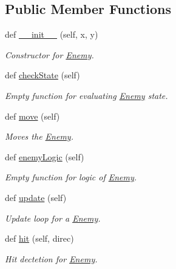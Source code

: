 \subsection*{Public Member Functions}
\begin{DoxyCompactItemize}
\item 
def \hyperlink{classactor_1_1enemy_1_1_enemy_a6924d71617a5022d67fd46b36141dfd2}{\+\_\+\+\_\+init\+\_\+\+\_\+} (self, x, y)
\begin{DoxyCompactList}\small\item\em Constructor for \hyperlink{classactor_1_1enemy_1_1_enemy}{Enemy}. \end{DoxyCompactList}\item 
\mbox{\label{classactor_1_1enemy_1_1_enemy_afa749d4d6a88fac474c3929ccd3b0753}} 
def \hyperlink{classactor_1_1enemy_1_1_enemy_afa749d4d6a88fac474c3929ccd3b0753}{check\+State} (self)
\begin{DoxyCompactList}\small\item\em Empty function for evaluating \hyperlink{classactor_1_1enemy_1_1_enemy}{Enemy} state. \end{DoxyCompactList}\item 
def \hyperlink{classactor_1_1enemy_1_1_enemy_acae64f8e1e7e13ee7c440c74e3c214c8}{move} (self)
\begin{DoxyCompactList}\small\item\em Moves the \hyperlink{classactor_1_1enemy_1_1_enemy}{Enemy}. \end{DoxyCompactList}\item 
\mbox{\label{classactor_1_1enemy_1_1_enemy_a94d38c945f048b873e33a539fb7cf502}} 
def \hyperlink{classactor_1_1enemy_1_1_enemy_a94d38c945f048b873e33a539fb7cf502}{enemy\+Logic} (self)
\begin{DoxyCompactList}\small\item\em Empty function for logic of \hyperlink{classactor_1_1enemy_1_1_enemy}{Enemy}. \end{DoxyCompactList}\item 
def \hyperlink{classactor_1_1enemy_1_1_enemy_a5a7ad5761870721d959d491b33eb4908}{update} (self)
\begin{DoxyCompactList}\small\item\em Update loop for a \hyperlink{classactor_1_1enemy_1_1_enemy}{Enemy}. \end{DoxyCompactList}\item 
def \hyperlink{classactor_1_1enemy_1_1_enemy_a26b704148d13a372e1bf150937e30673}{hit} (self, direc)
\begin{DoxyCompactList}\small\item\em Hit dectetion for \hyperlink{classactor_1_1enemy_1_1_enemy}{Enemy}. \end{DoxyCompactList}\end{DoxyCompactItemize}
